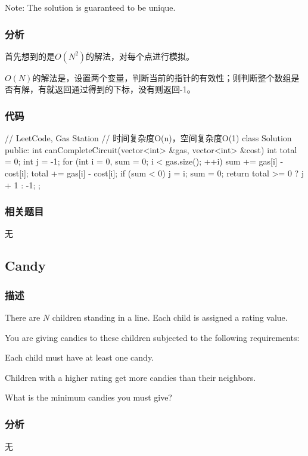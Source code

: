 Note:
The solution is guaranteed to be unique.


\subsubsection{分析}
首先想到的是$O(N^2)$的解法，对每个点进行模拟。

$O(N)$的解法是，设置两个变量，判断当前的指针的有效性；则判断整个数组是否有解，有就返回通过得到的下标，没有则返回-1。


\subsubsection{代码}
\begin{Code}
	// LeetCode, Gas Station
	// 时间复杂度O(n)，空间复杂度O(1)
	class Solution {
		public:
		int canCompleteCircuit(vector<int> &gas, vector<int> &cost) {
			int total = 0;
			int j = -1;
			for (int i = 0, sum = 0; i < gas.size(); ++i) {
				sum += gas[i] - cost[i];
				total += gas[i] - cost[i];
				if (sum < 0) {
					j = i;
					sum = 0;
				}
			}
			return total >= 0 ? j + 1 : -1;
		}
	};
\end{Code}


\subsubsection{相关题目}
\begindot
\item 无
\myenddot


\subsection{Candy} %
\label{sec:candy}


\subsubsection{描述}
There are $N$ children standing in a line. Each child is assigned a rating 
value.

You are giving candies to these children subjected to the following 
requirements:
\begindot
\item Each child must have at least one candy.
\item Children with a higher rating get more candies than their neighbors.
\myenddot

What is the minimum candies you must give?


\subsubsection{分析}
无


